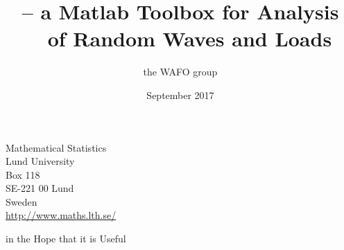 \documentclass[12pt,openright,twoside,titlepage,a4paper]{LUmanual}
\begin{document}
\ifpdf
{}
\else
{}
\fi

\frontmatter

\title{\noindent \hspace{9mm}-- a Matlab Toolbox for Analysis\\
   ~ \hspace*{6mm} of Random Waves and Loads}
\author{the WAFO group}
\date{September 2017}
\maketitle

{\thispagestyle{empty}
\begin{minipage}{\textwidth}
\end{minipage}
\vfill
\begin{minipage}{\textwidth}
Mathematical Statistics \\
Lund University \\
Box 118\\
SE-221 00 Lund \\
Sweden \\
\url{http://www.maths.lth.se/} \\[3mm]

\noindent

\noindent
\end{minipage}
}
\newpage{}

\begin{minipage}{\textwidth}
\vspace{7cm}
\begin{flushright}
  {\sc  %
  in the Hope that it is Useful}
\end{flushright}
\end{minipage}
\end{document}
